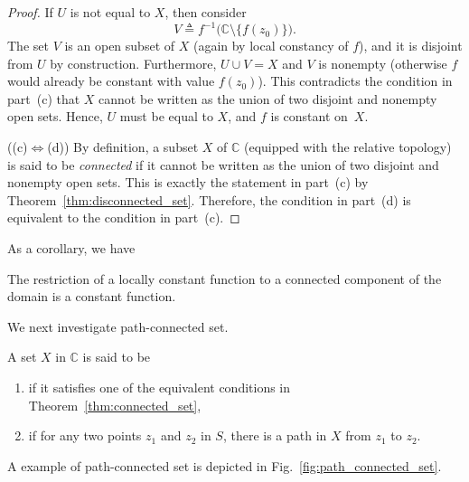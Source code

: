 \begin{proof}
	If $U$ is not equal to $X$, then consider
	\[
	V \triangleq f^{-1}\bigl(\mathbb{C}\setminus\{f(z_0)\}\bigr).
	\]
	The set $V$ is an open subset of $X$ (again by local constancy of $f$), and it is disjoint
	from $U$ by construction. Furthermore, $U\cup V = X$ and $V$ is nonempty (otherwise $f$ would
	already be constant with value $f(z_0)$). This contradicts the condition in part~(c) that $X$
	cannot be written as the union of two disjoint and nonempty open sets. Hence, $U$ must be
	equal to $X$, and $f$ is constant on~$X$.
	
	\medskip
	
	((c)$\Leftrightarrow$(d)) By definition, a subset $X$ of $\mathbb{C}$ (equipped with the
	relative topology) is said to be \emph{connected} if it cannot be written as the union of two
	disjoint and nonempty open sets. This is exactly the statement in part~(c) by Theorem~\ref{thm:disconnected_set}. Therefore, the
	condition in part~(d) is equivalent to the condition in part~(c).
\end{proof} 

As a corollary, we have
\begin{svgraybox}
	\begin{theorem}
	The restriction of a locally constant function to a connected component of the domain is a constant function.
	\end{theorem}
\end{svgraybox}

We next investigate path-connected set.

\begin{svgraybox}
	\begin{definition}
A set $X$ in $\mathbb{C}$ is said to be
\begin{enumerate}
\item {} if it satisfies one of the equivalent conditions in Theorem~\ref{thm:connected_set}, 

\item {} if for any two points $z_1$ and $z_2$ in $S$, there is a path in $X$ from $z_1$ to $z_2$.
\end{enumerate}
	\end{definition}
\end{svgraybox}


A example of path-connected set is depicted in Fig.~\ref{fig:path_connected_set}.


